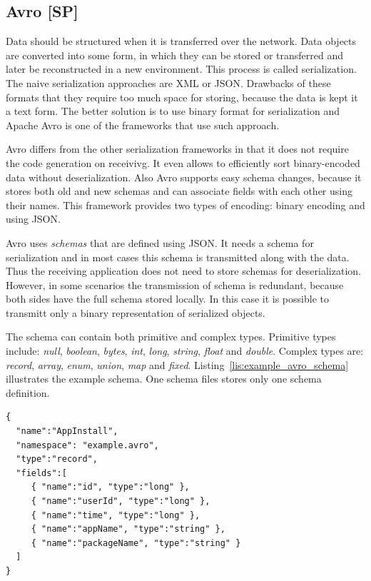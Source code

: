 \subsection{Avro [SP]}
\label{subs:avro}

Data should be structured when it is transferred over the network.
Data objects are converted into some form, in which they can be stored or transferred and later be reconstructed in a new environment.
This process is called serialization.
The naive serialization approaches are XML or JSON.
Drawbacks of these formats that they require too much space for storing, because the data is kept it a text form.
The better solution is to use binary format for serialization and Apache Avro is one of the frameworks that use such approach.

Avro differs from the other serialization frameworks in that it does not require the code generation on receivivg.
It even allows to efficiently sort binary-encoded data without deserialization.
Also Avro supports easy schema changes, because it stores both old and new schemas and can associate fields with each other using their names.
This framework provides two types of encoding: binary encoding and using JSON.

Avro uses \textit{schemas} that are defined using JSON.
It needs a schema for serialization and in most cases this schema is transmitted along with the data.
Thus the receiving application does not need to store schemas for deserialization.
However, in some scenarios the transmission of schema is redundant, because both sides have the full schema stored locally.
In this case it is possible to transmitt only a binary representation of serialized objects.

The schema can contain both primitive and complex types.
Primitive types include: \textit{null}, \textit{boolean}, \textit{bytes}, \textit{int}, \textit{long}, \textit{string}, \textit{float} and \textit{double}.
Complex types are: \textit{record}, \textit{array}, \textit{enum}, \textit{union}, \textit{map} and \textit{fixed}.
Listing~\ref{lis:example_avro_schema} illustrates the example schema.
One schema files stores only one schema definition.

\begin{lstlisting}[caption=Avro schema (example), label=lis:example_avro_schema]
{
  "name":"AppInstall",
  "namespace": "example.avro",
  "type":"record",
  "fields":[
     { "name":"id", "type":"long" },
     { "name":"userId", "type":"long" },
     { "name":"time", "type":"long" },
     { "name":"appName", "type":"string" },
     { "name":"packageName", "type":"string" }
  ]
}
\end{lstlisting}

